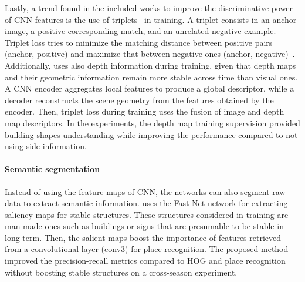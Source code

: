 Lastly, a trend found in the included works to improve the discriminative power of CNN features is the use of triplets~\parencite{martini-et-al:2020:s20216002,liu-et-al:2021:9561126,piasco-et-al:2021:6,sun-et-al:2021:9635886,yin-et-al:2021:3061375,yin-et-al:2021:661199} in training.
A triplet consists in an anchor image, a positive corresponding match, and an unrelated negative example. Triplet loss tries to minimize the matching distance between positive pairs (anchor, positive) and maximize that between negative ones (anchor, negative)~\parencite{sun-et-al:2021:9635886}.
Additionally, \cite{piasco-et-al:2021:6} uses also depth information during training, given that depth maps and their geometric information remain more stable across time than visual ones. A CNN encoder aggregates local features to produce a global descriptor, while a decoder reconstructs the scene geometry from the features obtained by the encoder. Then, triplet loss during training uses the fusion of image and depth map descriptors. In the experiments, the depth map training supervision provided building shapes understanding while improving the performance compared to not using side information.


\paragraph{Semantic segmentation}

Instead of using the feature maps of CNN, the networks can also segment raw data to extract semantic information.
\cite{naseer-et-al:2017:7989305} uses the Fast-Net network for extracting saliency maps for stable structures. These structures considered in training are man-made ones such as buildings or signs that are presumable to be stable in long-term. Then, the salient maps boost the importance of features retrieved from a convolutional layer (conv3) for place recognition. The proposed method improved the precision-recall metrics compared to HOG and place recognition without boosting stable structures on a cross-season experiment.

